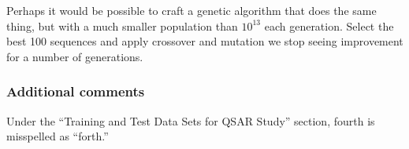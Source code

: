 \documentclass[10pt,a4paper]{article}
\begin{document}
	Perhaps it would be possible to craft a genetic algorithm that does the same thing, but with a much smaller population than $ 10^{13} $ each generation.
	Select the best 100 sequences and apply  crossover and mutation we stop seeing improvement for a number of generations.
	
	
	
	
	\subsubsection*{Additional comments}
	Under the ``Training and Test Data Sets for QSAR Study'' section, fourth is misspelled as ``forth.''
	
\end{document}
